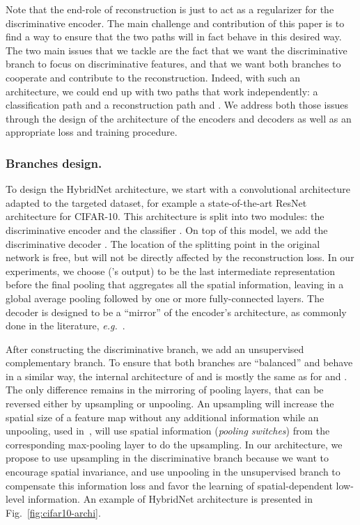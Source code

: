 \documentclass[runningheads]{llncs}
\begin{document}
Note that the end-role of reconstruction is just to act as a regularizer for the discriminative encoder.
The main challenge and contribution of this paper is to find a way to ensure that the two paths will in fact behave in this desired way. The two main issues that we tackle are the fact that we want the discriminative branch to focus on discriminative features, and that we want both branches to cooperate and contribute to the reconstruction. Indeed, with such an architecture, we could end up with two paths that work independently: a classification path  and a reconstruction path  and . We address both those issues through the design of the architecture of the encoders and decoders as well as an appropriate loss and training procedure.

\subsubsection{Branches design.}

To design the HybridNet architecture, we start with a convolutional architecture adapted to the targeted dataset, for example a state-of-the-art ResNet architecture for CIFAR-10. This architecture is split into two modules: the discriminative encoder  and the classifier . On top of this model, we add the discriminative decoder .
The location of the splitting point in the original network is free, but  will not be directly affected by the reconstruction loss. In our experiments, we choose  ('s output) to be the last intermediate representation before the final pooling that aggregates all the spatial information, leaving in  a global average pooling followed by one or more fully-connected layers. The decoder  is designed to be a ``mirror'' of the encoder's architecture, as commonly done in the literature, \textit{e.g.}~\cite{Zhao2016a,Rasmus2015,zeiler2014visualizing}.

After constructing the discriminative branch, we add an unsupervised complementary branch. To ensure that both branches are ``balanced'' and behave in a similar way, the internal architecture of  and  is mostly the same as for  and . The only difference remains in the mirroring of pooling layers, that can be reversed either by upsampling or unpooling. An upsampling will increase the spatial size of a feature map without any additional information while an unpooling, used in~\cite{Zhao2016a,Zhang2016a}, will use spatial information (\textit{pooling switches}) from the corresponding max-pooling layer to do the upsampling. In our architecture, we propose to use upsampling in the discriminative branch because we want to encourage spatial invariance, and use unpooling in the unsupervised branch to compensate this information loss and favor the learning of spatial-dependent low-level information. An example of HybridNet architecture is presented in Fig.~\ref{fig:cifar10-archi}.
\end{document}
